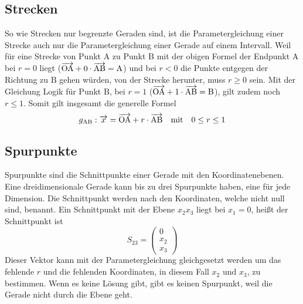 \documentclass{article}
\begin{document}
\subsection{Strecken} 
\begin{minipage}{6cm}
  \centering
\end{minipage}
\hfill 
\begin{minipage}{\dimexpr\textwidth-6cm} 
So wie Strecken nur begrenzte Geraden sind, ist die Parametergleichung einer Strecke auch nur die Parametergleichung einer Gerade auf einem Intervall. Weil für eine Strecke von Punkt $\mathrm{A}$ zu Punkt $\mathrm{B}$ mit der obigen Formel der Endpunkt $\mathrm{A}$ bei $r=0$ liegt (${\overrightarrow{\mathrm{OA}} + 0 \cdot \overrightarrow{\mathrm{AB}} = \mathrm{A}}$) und bei $r < 0$ die Punkte entgegen der Richtung zu $\mathrm{B}$ gehen würden, von der Strecke herunter, muss $r \geq 0$ sein. Mit der Gleichung Logik für Punkt $\mathrm{B}$, bei $r=1$ ($\overrightarrow{\mathrm{OA}} + 1 \cdot \overrightarrow{\mathrm{AB}} = \mathrm{B}$), gilt zudem noch $r \leq 1$. Somit gilt insgesamt die generelle Formel 
\[
 g_{\mathrm{AB}}: \overrightarrow{x} = \overrightarrow{\mathrm{OA}} + r \cdot \overrightarrow{\mathrm{AB}}
 \quad \text{mit} \quad
 0 \leq r \leq 1 
\]
\end{minipage} 
 
\subsection{Spurpunkte}
Spurpunkte sind die Schnittpunkte einer Gerade mit den Koordinatenebenen.
Eine dreidimensionale Gerade kann bis zu drei Spurpunkte haben, eine für jede Dimension. Die Schnittpunkt werden nach den Koordinaten, welche nicht null sind, benannt. \newline
Ein Schnittpunkt mit der Ebene $x_2x_3$ liegt bei $x_1 = 0$, heißt der Schnittpunkt ist
\[
 S_{23} = \begin{pmatrix} 0 \\ x_2 \\ x_3 \end{pmatrix} 
\]
Dieser Vektor kann mit der Parametergleichung gleichgesetzt werden um das fehlende $r$ und die fehlenden Koordinaten, in diesem Fall $x_2$ und $x_3$, zu bestimmen. Wenn es keine Lösung gibt, gibt es keinen Spurpunkt, weil die Gerade nicht durch die Ebene geht.
 
\end{document}
